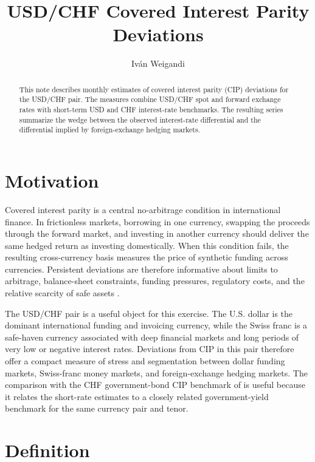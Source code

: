 \documentclass[12pt,a4paper]{article}
\title{USD/CHF Covered Interest Parity Deviations}
\author{Iv\'an Weigandi}
\begin{document}
\maketitle

\begin{abstract}
\noindent This note describes monthly estimates of covered interest parity (CIP) deviations for the USD/CHF pair. The measures combine USD/CHF spot and forward exchange rates with short-term USD and CHF interest-rate benchmarks. The resulting series summarize the wedge between the observed interest-rate differential and the differential implied by foreign-exchange hedging markets.
\end{abstract}

\section{Motivation}

Covered interest parity is a central no-arbitrage condition in international finance. In frictionless markets, borrowing in one currency, swapping the proceeds through the forward market, and investing in another currency should deliver the same hedged return as investing domestically. When this condition fails, the resulting cross-currency basis measures the price of synthetic funding across currencies. Persistent deviations are therefore informative about limits to arbitrage, balance-sheet constraints, funding pressures, regulatory costs, and the relative scarcity of safe assets \citep{AkramRimeSarno2008,BorioEtAl2016,DuTepperVerdelhan2018}.

The USD/CHF pair is a useful object for this exercise. The U.S. dollar is the dominant international funding and invoicing currency, while the Swiss franc is a safe-haven currency associated with deep financial markets and long periods of very low or negative interest rates. Deviations from CIP in this pair therefore offer a compact measure of stress and segmentation between dollar funding markets, Swiss-franc money markets, and foreign-exchange hedging markets. The comparison with the CHF government-bond CIP benchmark of \citet{DuKeeratiSchreger} is useful because it relates the short-rate estimates to a closely related government-yield benchmark for the same currency pair and tenor.

\section{Definition}
\end{document}
